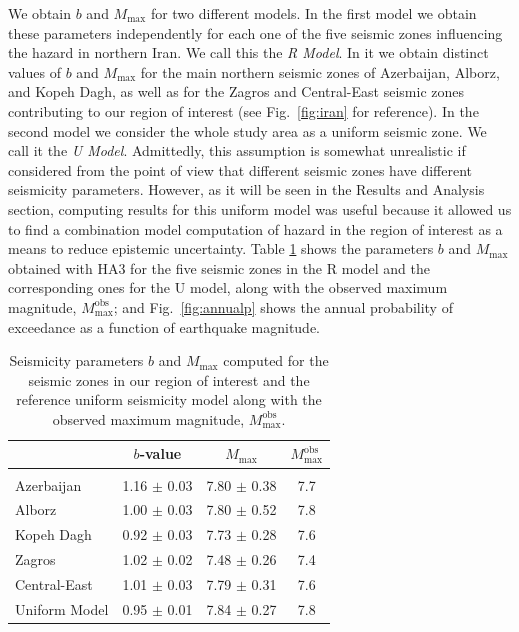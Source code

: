 We obtain $b$ and $M_{\max}$ for two different models. In the first model we obtain these parameters independently for each one of the five seismic zones influencing the hazard in northern Iran. We call this the \textit{R Model}. In it we obtain distinct values of $b$ and $M_{\max}$ for the main northern seismic zones of Azerbaijan, Alborz, and Kopeh Dagh, as well as for the Zagros and Central-East seismic zones contributing to our region of interest (see Fig.~\ref{fig:iran} for reference). In the second model we consider the whole study area as a uniform seismic zone. We call it the \textit{U Model}. Admittedly, this assumption is somewhat unrealistic if considered from the point of view that different seismic zones have different seismicity parameters. However, as it will be seen in the Results and Analysis section, computing results for this uniform model was useful because it allowed us to find a combination model computation of hazard in the region of interest as a means to reduce epistemic uncertainty. Table \ref{tab:params} shows the parameters $b$ and $M_{\max}$ obtained with HA3 for the five seismic zones in the R model and the corresponding ones for the U model, along with the observed maximum magnitude, $M_{\max}^{\mathrm{obs}}$; and Fig.~\ref{fig:annualp} shows the annual probability of exceedance as a function of earthquake magnitude.

\begin{table}%
    \centering
    \caption{Seismicity parameters $b$ and $M_{\max}$ computed for the seismic zones in our region of interest and the reference uniform seismicity model along with the observed maximum magnitude, $M_{\max}^{\mathrm{obs}}$.}
    \begin{tabular}{@{\hspace{0.2ex}}lccc@{\hspace{0.2ex}}}
        \cline{2-4}                                                                         \\[-1.6ex]
                        & $b$-value         & $M_{\max}$        & $M_{\max}^{\mathrm{obs}}$ \\[0.6ex]
        \hline                                                                              \\[-1.6ex]
        Azerbaijan      & 1.16 $\pm$ 0.03   & 7.80 $\pm$ 0.38   & 7.7                       \\
        Alborz          & 1.00 $\pm$ 0.03   & 7.80 $\pm$ 0.52   & 7.8                       \\
        Kopeh Dagh      & 0.92 $\pm$ 0.03   & 7.73 $\pm$ 0.28   & 7.6                       \\
        Zagros          & 1.02 $\pm$ 0.02   & 7.48 $\pm$ 0.26   & 7.4                       \\
        Central-East    & 1.01 $\pm$ 0.03   & 7.79 $\pm$ 0.31   & 7.6                       \\
        Uniform Model   & 0.95 $\pm$ 0.01   & 7.84 $\pm$ 0.27   & 7.8                       \\[0.5ex]
        \hline 
    \end{tabular}
    \label{tab:params} 
\end{table}

